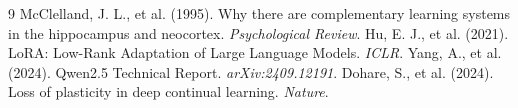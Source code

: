 \documentclass[10pt,twocolumn,letterpaper]{article}
\begin{document}
\begin{thebibliography}{9}
 McClelland, J. L., et al. (1995). Why there are complementary learning systems in the hippocampus and neocortex. \textit{Psychological Review}.
 Hu, E. J., et al. (2021). LoRA: Low-Rank Adaptation of Large Language Models. \textit{ICLR}.
 Yang, A., et al. (2024). Qwen2.5 Technical Report. \textit{arXiv:2409.12191}.
 Dohare, S., et al. (2024). Loss of plasticity in deep continual learning. \textit{Nature}.
\end{thebibliography}
\end{document}
